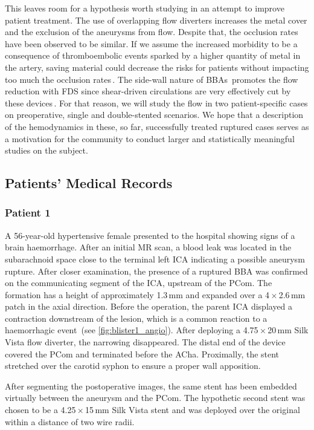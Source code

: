 This leaves room for a hypothesis worth studying in an attempt to improve patient treatment. The use of overlapping flow diverters increases the metal cover and the exclusion of the aneurysms from flow. Despite that, the occlusion rates have been observed to be similar. If we assume the increased morbidity to be a consequence of thromboembolic events sparked by a higher quantity of metal in the artery, saving material could decrease the risks for patients without impacting too much the occlusion rates\,\cite{Ji2017}. The side-wall nature of BBAs\,\cite{Papasilekas2020} promotes the flow reduction with FDS since shear-driven circulations are very effectively cut by these devices\,\cite{Augsburger2011}. For that reason, we will study the flow in two patient-specific cases on preoperative, single and double-stented scenarios. We hope that a description of the hemodynamics in these, so far, successfully treated ruptured cases serves as a motivation for the community to conduct larger and statistically meaningful studies on the subject.

\subsection{Patients' Medical Records}
\subsubsection*{Patient 1}
A 56-year-old hypertensive female presented to the hospital showing signs of a brain haemorrhage. After an initial MR scan, a blood leak was located in the subarachnoid space close to the terminal left ICA indicating a possible aneurysm rupture. After closer examination, the presence of a ruptured BBA was confirmed on the communicating segment of the ICA, upstream of the PCom. The formation has a height of approximately 1.3\,mm and expanded over a 4\,$\times$\,2.6\,mm patch in the axial direction. Before the operation, the parent ICA displayed a contraction downstream of the lesion, which is a common reaction to a haemorrhagic event\,\cite{Papasilekas2020} (see \autoref{fig:blister1_angio}). After deploying a 4.75\,$\times$\,20\,mm Silk Vista flow diverter, the narrowing disappeared. The distal end of the device covered the PCom and terminated before the ACha. Proximally, the stent stretched over the carotid syphon to ensure a proper wall apposition.

After segmenting the postoperative images, the same stent has been embedded virtually between the aneurysm and the PCom. The hypothetic second stent was chosen to be a 4.25\,$\times$\,15\,mm Silk Vista stent and was deployed over the original within a distance of two wire radii.

